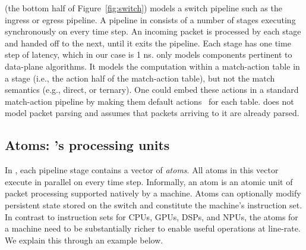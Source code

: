 \absmachine (the bottom half of Figure~\ref{fig:switch}) models a
switch pipeline such as the ingress or egress pipeline. A pipeline in
\absmachine consists of a number of stages executing synchronously on
every time step. An incoming packet is processed by each stage and
handed off to the next, until it exits the pipeline. Each stage has
one time step of latency, which in our case is 1 ns. \absmachine
only models components pertinent to data-plane algorithms.  It models
the computation within a match-action table in a stage (i.e., the
action half of the match-action table), but not the match semantics
(e.g., direct, or ternary). One could embed these actions in a
standard match-action pipeline by making them default
actions~\cite{p4spec} for each table.    \absmachine does not model packet parsing
and assumes that packets arriving to it are already parsed.


\subsection{Atoms: \absmachine's processing units}
\label{ss:atoms}

In \absmachine, each pipeline stage contains a vector of
\textit{atoms}. All atoms in this vector execute in parallel on every
time step.  Informally, an atom is an atomic unit of packet processing
supported natively by a \absmachine machine. Atoms can optionally
modify persistent state stored on the switch and constitute the
machine's instruction set.  In contrast to instruction sets for CPUs,
GPUs, DSPs, and NPUs, the atoms for a \absmachine machine need to be
substantially richer to enable useful operations at line-rate. We
explain this through an example below.

